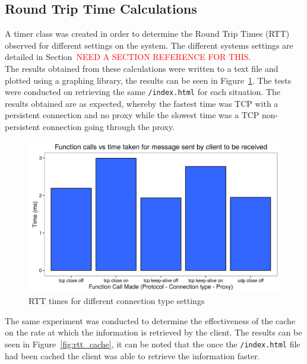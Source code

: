 \documentclass[10pt,twocolumn]{witseiepaper}
\begin{document}
	\subsection{Round Trip Time Calculations}
	
		A timer class was created in order to determine the Round Trip Times (RTT) observed for different settings on the system. The different systems settings are detailed in Section~\textcolor{red}{NEED A SECTION REFERENCE FOR THIS}. \\
		
		The results obtained from these calculations were written to a text file and plotted using a graphing library, the results can be seen in Figure~\ref{fig:rtt}. The tests were conducted on retrieving the same \texttt{/index.html} for each situation. The results obtained are as expected, whereby the fastest time was TCP with a persistent connection and no proxy while the slowest time was a TCP non-persistent connection going through the proxy. 
		
		\begin{figure}[htbp]
			\centering
			\includegraphics[width=\columnwidth]{resources/RTT.png}
			\caption{RTT times for different connection type settings}
			\label{fig:rtt}
		\end{figure}
		
		The same experiment was conducted to determine the effectiveness of the cache on the rate at which the information is retrieved by the client. The results can be seen in Figure~\ref{fig:rtt_cache}, it can be noted that the once the \texttt{/index.html} file had been cached the client was able to retrieve the information faster.
		
\end{document}
